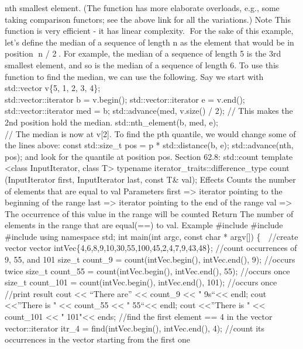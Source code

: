 nth smallest element. (The function has more elaborate overloads, e.g.,
some taking comparison functors; see the above link for all the
variations.) Note This function is very eﬃcient - it has linear
complexity. For the sake of this example, let's deﬁne the median of a
sequence of length n as the element that would be in position ⌈n / 2⌉.
For example, the median of a sequence of length 5 is the 3rd smallest
element, and so is the median of a sequence of length 6. To use this
function to ﬁnd the median, we can use the following. Say we start with
std::vector v\{5, 1, 2, 3, 4\};\\
std::vector::iterator b = v.begin(); std::vector::iterator e = v.end();
std::vector::iterator med = b; std::advance(med, v.size() / 2); // This
makes the 2nd position hold the median. std::nth\_element(b, med, e);\\
// The median is now at v{[}2{]}. To ﬁnd the pth quantile, we would
change some of the lines above: const std::size\_t pos = p *
std::distance(b, e); std::advance(nth, pos); and look for the quantile
at position pos. Section 62.8: std::count template \textless class
InputIterator, class T\textgreater{} typename
iterator\_traits::difference\_type count (InputIterator first,
InputIterator last, const T\& val); Eﬀects Counts the number of elements
that are equal to val Parameters first =\textgreater{} iterator pointing
to the beginning of the range last =\textgreater{} iterator pointing to
the end of the range val =\textgreater{} The occurrence of this value in
the range will be counted Return The number of elements in the range
that are equal(==) to val. Example \#include \#include \#include using
namespace std; int main(int argc, const char * argv{[}{]}) \{  //create
vector vector intVec\{4,6,8,9,10,30,55,100,45,2,4,7,9,43,48\}; //count
occurrences of 9, 55, and 101 size\_t count\_9 = count(intVec.begin(),
intVec.end(), 9); //occurs twice size\_t count\_55 =
count(intVec.begin(), intVec.end(), 55); //occurs once size\_t
count\_101 = count(intVec.begin(), intVec.end(), 101); //occurs once
//print result cout \textless\textless{} ``There are''
\textless\textless{} count\_9 \textless\textless{} "
9s``\textless\textless{} endl; cout \textless\textless{}''There is "
\textless\textless{} count\_55 \textless\textless{} "
55``\textless\textless{} endl; cout \textless\textless{}''There is "
\textless\textless{} count\_101 \textless\textless{} "
101"\textless\textless{} ends; //find the first element == 4 in the
vector vector::iterator itr\_4 = find(intVec.begin(), intVec.end(), 4);
//count its occurrences in the vector starting from the first one
